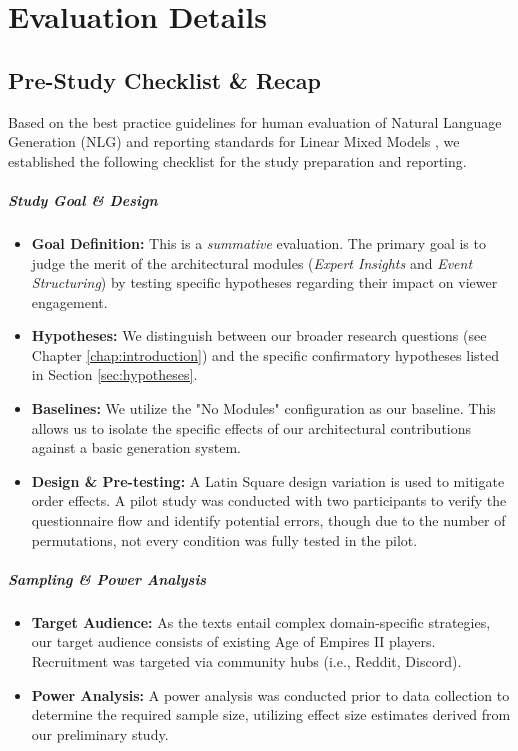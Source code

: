 \chapter{Evaluation Details}
\label{appendix:evaluation-details}

\begingroup

\section{Pre-Study Checklist \& Recap}
\label{appendix:pre-study-checklist}

Based on the best practice guidelines for human evaluation of Natural Language Generation (NLG) \cite{vanderlee2021} and reporting standards for Linear Mixed Models \cite{meteyard2020}, we established the following checklist for the study preparation and reporting.

\paragraph{Study Goal \& Design}
\begin{itemize}
  \item \textbf{Goal Definition:} This is a \textit{summative} evaluation. The primary goal is to judge the merit of the architectural modules (\textit{Expert Insights} and \textit{Event Structuring}) by testing specific hypotheses regarding their impact on viewer engagement.
  \item \textbf{Hypotheses:} We distinguish between our broader research questions (see Chapter \ref{chap:introduction}) and the specific confirmatory hypotheses listed in Section \ref{sec:hypotheses}.
  \item \textbf{Baselines:} We utilize the "No Modules" configuration as our baseline. This allows us to isolate the specific effects of our architectural contributions against a basic generation system.
  \item \textbf{Design \& Pre-testing:} A Latin Square design variation is used to mitigate order effects. A pilot study was conducted with two participants to verify the questionnaire flow and identify potential errors, though due to the number of permutations, not every condition was fully tested in the pilot.
\end{itemize}

\paragraph{Sampling \& Power Analysis}
\begin{itemize}
  \item \textbf{Target Audience:} As the texts entail complex domain-specific strategies, our target audience consists of existing Age of Empires II players. Recruitment was targeted via community hubs (i.e., Reddit, Discord).
  \item \textbf{Power Analysis:} A power analysis was conducted prior to data collection to determine the required sample size, utilizing effect size estimates derived from our preliminary study.
\end{itemize}

